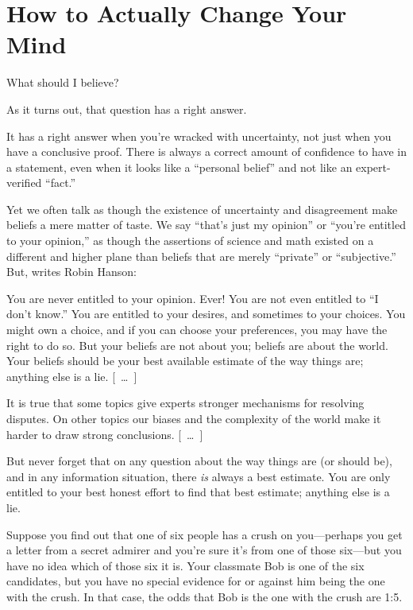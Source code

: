 \part{How to Actually Change Your Mind}




{
 What should I believe?}

{
 As it turns out, that question has a right answer.}

{
 It has a right answer when you're wracked with
uncertainty, not just when you have a conclusive proof. There is always
a correct amount of confidence to have in a statement, even when it
looks like a ``personal belief'' and
not like an expert-verified
``fact.''}

{
 Yet we often talk as though the existence of uncertainty and
disagreement make beliefs a mere matter of taste. We say
``that's just my
opinion'' or
``you're entitled to your
opinion,'' as though the assertions of science and
math existed on a different and higher plane than beliefs that are
merely ``private'' or
``subjective.'' But, writes Robin
Hanson:}

{
 You are never entitled to your opinion. Ever! You are not even
entitled to ``I don't
know.'' You are entitled to your desires, and
sometimes to your choices. You might own a choice, and if you can
choose your preferences, you may have the right to do so. But your
beliefs are not about you; beliefs are about the world. Your beliefs
should be your best available estimate of the way things are; anything
else is a lie. [~\ldots~]}

{
 It is true that some topics give experts stronger mechanisms for
resolving disputes. On other topics our biases and the complexity of
the world make it harder to draw strong conclusions. [~\ldots~]}

{
 But never forget that on any question about the way things are (or
should be), and in any information situation, there \textit{is} always
a best estimate. You are only entitled to your best honest effort to
find that best estimate; anything else is a lie.}

{
 Suppose you find out that one of six people has a crush on
you---perhaps you get a letter from a secret admirer and
you're sure it's from one of those
six---but you have no idea which of those six it is. Your classmate Bob
is one of the six candidates, but you have no special evidence for or
against him being the one with the crush. In that case, the odds that
Bob is the one with the crush are 1:5.}

